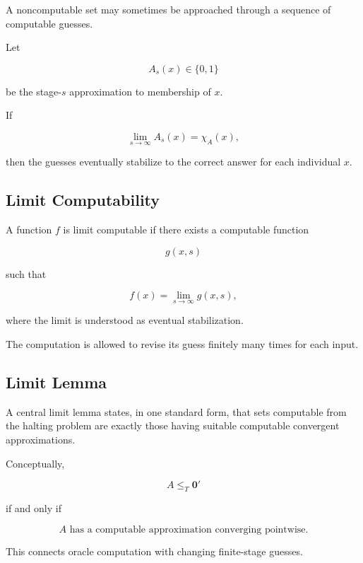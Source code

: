 A noncomputable set may sometimes be approached through a sequence of
computable guesses.

Let

\[
\boxed{
A_s(x)
\in
\{0,1\}
}
\]

be the stage-\(s\) approximation to membership of \(x\).

If

\[
\boxed{
\lim_{s\to\infty}
A_s(x)
=
\chi_A(x),
}
\]

then the guesses eventually stabilize to the correct answer for each
individual \(x\).

\subsection{Limit Computability}
\label{subsec:limit-computability}

A function \(f\) is limit computable if there exists a computable function

\[
g(x,s)
\]

such that

\[
\boxed{
f(x)
=
\lim_{s\to\infty}
g(x,s),
}
\]

where the limit is understood as eventual stabilization.

The computation is allowed to revise its guess finitely many times for each
input.

\subsection{Limit Lemma}
\label{subsec:limit-lemma}

A central limit lemma states, in one standard form, that sets computable
from the halting problem are exactly those having suitable computable
convergent approximations.

Conceptually,

\[
\boxed{
A\leq_T\mathbf{0}'
}
\]

if and only if

\[
\boxed{
A
\text{ has a computable approximation converging pointwise}.
}
\]

This connects oracle computation with changing finite-stage guesses.

